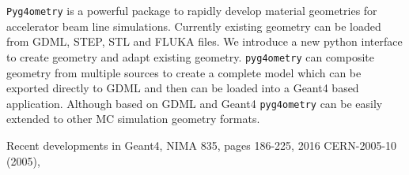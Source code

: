 \documentclass[a4paper,
               keeplastbox,   %
               ]{jacow}
\begin{document}
\verb|Pyg4ometry| is a powerful package to rapidly develop material geometries for accelerator beam line simulations. Currently existing geometry can
be loaded from GDML, STEP, STL and FLUKA files. We introduce a new python interface to create geometry and adapt existing geometry. \verb|pyg4ometry| 
can composite geometry from multiple sources to create a complete model which can be exported directly to GDML and then can be loaded into a Geant4 
based application. Although based on GDML and Geant4 \verb|pyg4ometry| can be easily extended to other MC simulation geometry formats.  

%
%

%
	{\printbibliography}%
	{%
	
	\begin{thebibliography}{9} %
	
	 Recent developments in Geant4, NIMA 835, pages 186-225, 2016 
	 CERN-2005-10 (2005), 
	

	\end{thebibliography}
} %


% 
\end{document}
